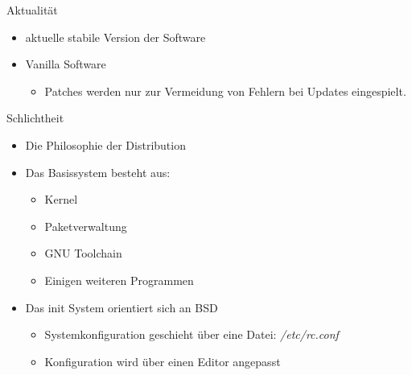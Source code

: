 \begin{slide}{Aktualit\"{a}t}
	\begin{itemize}
		\item{aktuelle stabile Version der Software}
		\item{Vanilla Software
			\begin{itemize}
				\item{Patches werden nur zur Vermeidung von Fehlern
					bei Updates eingespielt.}
			\end{itemize}
		}
	\end{itemize}
\end{slide}

\begin{slide}{Schlichtheit}
	\begin{itemize}
		\item{Die Philosophie der Distribution}
		\item{Das Basissystem besteht aus:
			\begin{itemize}
				\item{Kernel}
				\item{Paketverwaltung}
				\item{GNU Toolchain}
				\item{Einigen weiteren Programmen}
			\end{itemize}
		}
		\item{Das init System orientiert sich an BSD
			\begin{itemize}
				\item{Systemkonfiguration geschieht \"{u}ber eine Datei:
					\textit{/etc/rc.conf}}
				\item{Konfiguration wird \"{u}ber einen Editor angepasst}
			\end{itemize}
		}
	\end{itemize}
\end{slide}

